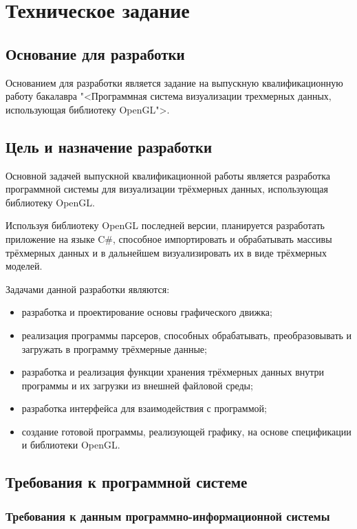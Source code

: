 \section{Техническое задание}
\subsection{Основание для разработки}

Основанием для разработки является задание на выпускную квалификационную работу бакалавра "<Программная система визуализации трехмерных данных, использующая библиотеку OpenGL">.

\subsection{Цель и назначение разработки}

Основной задачей выпускной квалификационной работы является разработка программной системы для визуализации трёхмерных данных, использующая библиотеку OpenGL.

Используя библиотеку OpenGL последней версии, планируется разработать приложение на языке C\#, способное импортировать и обрабатывать массивы трёхмерных данных и в дальнейшем визуализировать их в виде трёхмерных моделей.

Задачами данной разработки являются:
\begin{itemize}
\item разработка и проектирование основы графического движка;
\item реализация программы парсеров, способных обрабатывать, преобразовывать и загружать в программу трёхмерные данные;
\item разработка и реализация функции хранения трёхмерных данных внутри программы и их загрузки из внешней файловой среды;
\item разработка интерфейса для взаимодействия с программой;
\item создание готовой программы, реализующей графику, на основе спецификации и библиотеки OpenGL.
\end{itemize}

\subsection{Требования к программной системе}

\subsubsection{Требования к данным программно-информационной системы}

